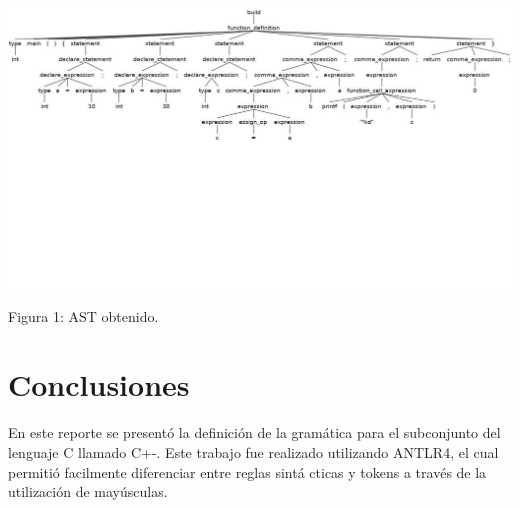 \documentclass[12pt]{article}
\begin{document}
\centerline{\includegraphics[trim={0 9cm 0 0},scale=0.45]{arbol1.jpg}}
\centerline{Figura 1: AST obtenido.}
\clearpage

\section*{Conclusiones}
En este reporte se presentó la definición de la gramática para el subconjunto del lenguaje C llamado C+-. Este trabajo fue realizado utilizando ANTLR4, el cual permitió facilmente diferenciar entre reglas sint\'a cticas y tokens a trav\'es de la utilizaci\'on de may\'usculas.
\end{document}
